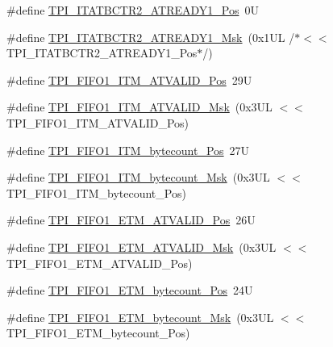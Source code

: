 \begin{DoxyCompactItemize}
\item 
\#define \mbox{\hyperlink{group___c_m_s_i_s___t_p_i_gae0edc53203a2373fef7734be91e6125a}{T\+P\+I\+\_\+\+I\+T\+A\+T\+B\+C\+T\+R2\+\_\+\+A\+T\+R\+E\+A\+D\+Y1\+\_\+\+Pos}}~0U
\item 
\#define \mbox{\hyperlink{group___c_m_s_i_s___t_p_i_ga32573fb2508a35660ab785a85c5b38a7}{T\+P\+I\+\_\+\+I\+T\+A\+T\+B\+C\+T\+R2\+\_\+\+A\+T\+R\+E\+A\+D\+Y1\+\_\+\+Msk}}~(0x1\+U\+L /$\ast$$<$$<$ T\+P\+I\+\_\+\+I\+T\+A\+T\+B\+C\+T\+R2\+\_\+\+A\+T\+R\+E\+A\+D\+Y1\+\_\+\+Pos$\ast$/)
\item 
\#define \mbox{\hyperlink{group___c_m_s_i_s___t_p_i_ga08edfc862b2c8c415854cc4ae2067dfb}{T\+P\+I\+\_\+\+F\+I\+F\+O1\+\_\+\+I\+T\+M\+\_\+\+A\+T\+V\+A\+L\+I\+D\+\_\+\+Pos}}~29U
\item 
\#define \mbox{\hyperlink{group___c_m_s_i_s___t_p_i_gabc1f6a3b6cac0099d7c01ca949b4dd08}{T\+P\+I\+\_\+\+F\+I\+F\+O1\+\_\+\+I\+T\+M\+\_\+\+A\+T\+V\+A\+L\+I\+D\+\_\+\+Msk}}~(0x3\+U\+L $<$$<$ T\+P\+I\+\_\+\+F\+I\+F\+O1\+\_\+\+I\+T\+M\+\_\+\+A\+T\+V\+A\+L\+I\+D\+\_\+\+Pos)
\item 
\#define \mbox{\hyperlink{group___c_m_s_i_s___t_p_i_gaa22ebf7c86e4f4b2c98cfd0b5981375a}{T\+P\+I\+\_\+\+F\+I\+F\+O1\+\_\+\+I\+T\+M\+\_\+bytecount\+\_\+\+Pos}}~27U
\item 
\#define \mbox{\hyperlink{group___c_m_s_i_s___t_p_i_gacba2edfc0499828019550141356b0dcb}{T\+P\+I\+\_\+\+F\+I\+F\+O1\+\_\+\+I\+T\+M\+\_\+bytecount\+\_\+\+Msk}}~(0x3\+U\+L $<$$<$ T\+P\+I\+\_\+\+F\+I\+F\+O1\+\_\+\+I\+T\+M\+\_\+bytecount\+\_\+\+Pos)
\item 
\#define \mbox{\hyperlink{group___c_m_s_i_s___t_p_i_ga3177b8d815cf4a707a2d3d3d5499315d}{T\+P\+I\+\_\+\+F\+I\+F\+O1\+\_\+\+E\+T\+M\+\_\+\+A\+T\+V\+A\+L\+I\+D\+\_\+\+Pos}}~26U
\item 
\#define \mbox{\hyperlink{group___c_m_s_i_s___t_p_i_ga0e8f29a1e9378d1ceb0708035edbb86d}{T\+P\+I\+\_\+\+F\+I\+F\+O1\+\_\+\+E\+T\+M\+\_\+\+A\+T\+V\+A\+L\+I\+D\+\_\+\+Msk}}~(0x3\+U\+L $<$$<$ T\+P\+I\+\_\+\+F\+I\+F\+O1\+\_\+\+E\+T\+M\+\_\+\+A\+T\+V\+A\+L\+I\+D\+\_\+\+Pos)
\item 
\#define \mbox{\hyperlink{group___c_m_s_i_s___t_p_i_gaab31238152b5691af633a7475eaf1f06}{T\+P\+I\+\_\+\+F\+I\+F\+O1\+\_\+\+E\+T\+M\+\_\+bytecount\+\_\+\+Pos}}~24U
\item 
\#define \mbox{\hyperlink{group___c_m_s_i_s___t_p_i_gab554305459953b80554fdb1908b73291}{T\+P\+I\+\_\+\+F\+I\+F\+O1\+\_\+\+E\+T\+M\+\_\+bytecount\+\_\+\+Msk}}~(0x3\+U\+L $<$$<$ T\+P\+I\+\_\+\+F\+I\+F\+O1\+\_\+\+E\+T\+M\+\_\+bytecount\+\_\+\+Pos)

\end{DoxyCompactItemize}
